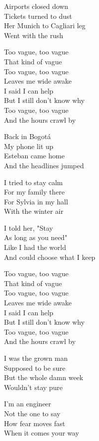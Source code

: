 \begin{lyrics}
Airports closed down\\
Tickets turned to dust\\
Her Munich to Cagliari leg\\
Went with the rush

Too vague, too vague\\
That kind of vague\\
Too vague, too vague\\
Leaves me wide awake\\
I said I can help\\
But I still don't know why\\
Too vague, too vague\\
And the hours crawl by

Back in Bogotá\\
My phone lit up\\
Esteban came home\\
And the headlines jumped

I tried to stay calm\\
For my family there\\
For Sylvia in my hall\\
With the winter air

I told her, "Stay\\
As long as you need"\\
Like I had the world\\
And could choose what I keep

Too vague, too vague\\
That kind of vague\\
Too vague, too vague\\
Leaves me wide awake\\
I said I can help\\
But I still don't know why\\
Too vague, too vague\\
And the hours crawl by

I was the grown man\\
Supposed to be sure\\
But the whole damn week\\
Wouldn't stay pure

I'm an engineer\\
Not the one to say\\
How fear moves fast\\
When it comes your way
\end{lyrics}

